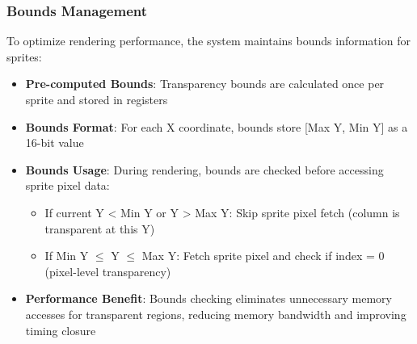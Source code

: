 \documentclass[12pt,a4paper]{article}
\begin{document}
\subsubsection{Bounds Management}
To optimize rendering performance, the system maintains bounds information for sprites:
\begin{itemize}
    \item \textbf{Pre-computed Bounds}: Transparency bounds are calculated once per sprite and stored in registers
    \item \textbf{Bounds Format}: For each X coordinate, bounds store [Max Y, Min Y] as a 16-bit value
    \item \textbf{Bounds Usage}: During rendering, bounds are checked before accessing sprite pixel data:
    \begin{itemize}
        \item If current Y < Min Y or Y > Max Y: Skip sprite pixel fetch (column is transparent at this Y)
        \item If Min Y $\le$ Y $\le$ Max Y: Fetch sprite pixel and check if index = 0 (pixel-level transparency)
    \end{itemize}
    \item \textbf{Performance Benefit}: Bounds checking eliminates unnecessary memory accesses for transparent regions, reducing memory bandwidth and improving timing closure
\end{itemize}
\end{document}
